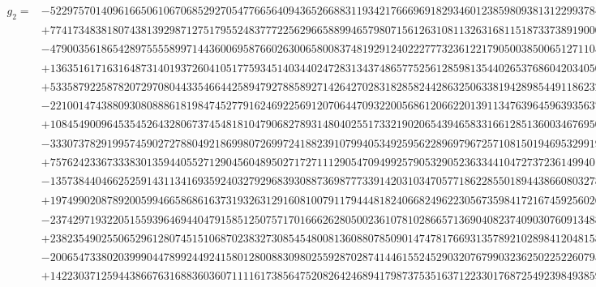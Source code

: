 \documentclass[preprint,12pt,authoryear]{elsarticle}
\begin{document}
{\tiny
\begin{align*}
  g_2=&-5229757014096166506106706852927054776656409436526688311934217666969182934601238598093813122993784633757481615360x_5^{25}\\
  &+77417348381807438139298712751795524837772256296658899465798071561263108113263168115187337389190007008413770618112x_5^{24}\\
  &-479003561865428975555899714436006958766026300658008374819291240222777323612217905003850065127110597318088478641792x_5^{23}\\
  &+1363516171631648731401937260410517759345140344024728313437486577525612859813544026537686042034050828432977603879232x_5^{22}\\
  &+533587922587820729708044335466442589479278858927142642702831828582442863250633819428985449118623257898991410037152x_5^{21}\\
  &-22100147438809308088861819847452779162469225691207064470932200568612066220139113476396459639356379722280870005175520x_5^{20}\\
  &+108454900964535452643280673745481810479068278931480402551733219020654394658331661285136003467695044177290332008077552x_5^{19}\\
  &-333073782919957459027278804921869980726997241882391079940534925956228969796725710815019469532991976447383544674526084x_5^{18}\\
  &+757624233673338301359440552712904560489502717271112905470949925790532905236334410472737236149940199890686132929621704x_5^{17}\\
  &-1357384404662525914311341693592403279296839308873698777339142031034705771862285501894438660803278932926999068794546582x_5^{16}\\
  &+1974990208789200599466586861637319326312916081007911794448182406682496223056735984172167459256026946263774303269130502x_5^{15}\\
  &-2374297193220515593964694404791585125075717016662628050023610781028665713690408237409030760913488268277385743966777032x_5^{14}\\
  &+2382354902550652961280745151068702383273085454800813608807850901474781766931357892102898412048158076148480110682671270x_5^{13}\\
  &-2006547338020399904478992449241580128008830980255928702874144615524529032076799032362502252260795483084720768354418906x_5^{12}\\
  &+1422303712594438667631688360360711116173856475208264246894179873753516371223301768725492398493859422183929726651437959x_5^{11}\\

\end{align*}}
\end{document}
